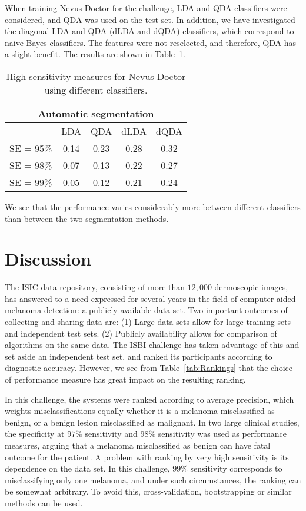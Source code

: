 \documentclass[a4paper,12pt]{article}
\begin{document}
When training Nevus Doctor for the challenge, LDA and QDA classifiers were considered, and QDA was used on the test set. 
In addition, we have investigated the diagonal LDA and QDA (dLDA and dQDA) classifiers, which correspond to naive Bayes classifiers. 
The features were not reselected, and therefore, QDA has a slight benefit. 
The results are shown in Table~\ref{tab:Diagonal}. 
\begin{table}
\begin{tabular}{c | c | c | c | c}
        \multicolumn{5}{c}{Automatic segmentation} \\
        \hline
        & LDA & QDA & dLDA & dQDA \\
        \hline
   SE = 95\% & 0.14 & 0.23 & 0.28 &0.32\\
  SE = 98\% & 0.07 & 0.13 & 0.22 & 0.27 \\
  SE = 99\% & 0.05 & 0.12 & 0.21 & 0.24 
\end{tabular}
  \caption{High-sensitivity measures for Nevus Doctor using different classifiers.}
  \label{tab:Diagonal}
\end{table}
We see that the performance varies considerably more between different classifiers than between the two segmentation methods. 

\section{Discussion} \label{sec:Discussion} %

The ISIC data repository, consisting of more than $12,000$ dermoscopic images, has answered to a need expressed for several years in the field of computer aided melanoma detection: a publicly available data set. 
Two important outcomes of collecting and sharing data are: 
(1) Large data sets allow for large training sets and independent test sets. (2) Publicly availability allows for comparison of algorithms on the same data.
The ISBI challenge has taken advantage of this and set aside an independent test set, and ranked its participants according to diagnostic accuracy. 
However, we see from Table~\ref{tab:Rankings} that the choice of performance measure has great impact on the resulting ranking. 

In this challenge, the systems were ranked according to average precision, which weights misclassifications equally whether it is a melanoma misclassified as benign, or a benign lesion misclassified as malignant. 
In two large clinical studies, the specificity at $97\%$ sensitivity \citep{Malvehy2014Clinical} and $98\%$ sensitivity \citep{Monheit2011Performance} was used as performance measures, arguing that a melanoma misclassified as benign can have fatal outcome for the patient. 
A problem with ranking by very high sensitivity is its dependence on the data set. 
In this challenge, $99\%$ sensitivity corresponds to misclassifying only one melanoma, and under such circumstances, the ranking can be somewhat arbitrary. 
To avoid this, cross-validation, bootstrapping or similar methods can be used.   
\end{document}
